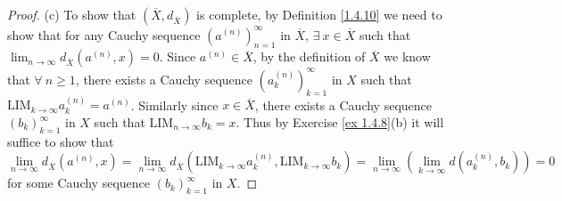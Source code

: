 \begin{proof}{(c)}
    To show that \((\overline{X}, d_{\overline{X}})\) is complete, by Definition \ref{1.4.10} we need to show that for any Cauchy sequence \((a^{(n)})_{n = 1}^\infty\) in \(\overline{X}\), \(\exists\ x \in \overline{X}\) such that \(\lim_{n \to \infty} d_{\overline{X}}(a^{(n)}, x) = 0\).
    Since \(a^{(n)} \in \overline{X}\), by the definition of \(\overline{X}\) we know that \(\forall\ n \geq 1\), there exists a Cauchy sequence \((a_k^{(n)})_{k = 1}^\infty\) in \(X\) such that \(\text{LIM}_{k \to \infty} a_k^{(n)} = a^{(n)}\).
    Similarly since \(x \in \overline{X}\), there exists a Cauchy sequence \((b_k)_{k = 1}^{\infty}\) in \(X\) such that \(\text{LIM}_{n \to \infty} b_k = x\).
    Thus by Exercise \ref{ex 1.4.8}(b) it will suffice to show that
    \[
        \lim_{n \to \infty} d_{\overline{X}}(a^{(n)}, x) = \lim_{n \to \infty} d_{\overline{X}}(\text{LIM}_{k \to \infty} a_k^{(n)}, \text{LIM}_{k \to \infty} b_k) = \lim_{n \to \infty} (\lim_{k \to \infty} d(a_k^{(n)}, b_k)) = 0
    \]
    for some Cauchy sequence \((b_k)_{k = 1}^{\infty}\) in \(X\).


\end{proof}
